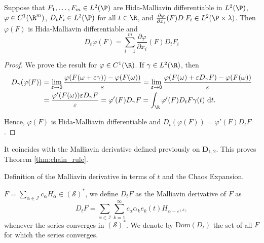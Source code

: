   \begin{theorem}\label{thm:hida-chain-rule}

    Suppose that $F_1, \ldots, F_m \in L^2(\P)$ are Hida-Malliavin differentiable in $L^2(\P)$, $\varphi \in C^1(\R^m)$, $D_tF_i \in L^2(\P)$ for all $t \in \R$, and $\frac{\partial \varphi}{\partial x_i}(F)D_{\cdot}F_i \in L^2(\P \times \lambda)$. Then $\varphi(F)$ is Hida-Malliavin differentiable and 
  \[
  D_t \varphi(F) = \sum_{i=1}^m \frac{\partial \varphi}{\partial x_i}(F) D_t F_i
  \]
  \end{theorem}

  \begin{proof}
  We prove the result for $\varphi \in C^1(\R)$. If $\gamma \in L^2(\R)$, then 
  \begin{equation*}
  \begin{aligned}
    D_\gamma(\varphi(F)) & = \lim_{\varepsilon \rightarrow 0} \frac{\varphi(F(\omega+\varepsilon \gamma))-\varphi(F(\omega))}{\varepsilon}
                         =\lim _{\varepsilon \rightarrow 0} \frac{\varphi (F(\omega)+\varepsilon D_\gamma F)-\varphi(F(\omega))}{\varepsilon} \\
                         & =\frac{\varphi^{\prime}(F(\omega)) \varepsilon D_\gamma F}{\varepsilon} = \varphi^{\prime}(F) D_\gamma F
                         =\int_{\R} \varphi^{\prime}(F) D_t F \gamma(t) ~\mathrm{d} t .
  \end{aligned}
    \label{eq:202404241654}
  \end{equation*} 

  Hence, $\varphi(F)$ is Hida-Malliavin differentiable and $D_t(\varphi(F)) = \varphi'(F) D_t F$.
  \end{proof}

  It coincides with the Malliavin derivative defined previously on $\mathbf{D}_{1,2}$. This proves Theorem \ref{thm:chain_rule}.

  Definition of the Malliavin derivative in terms of $t$ and the Chaos Expansion. 

  \begin{definition}
    $F = \sum_{\alpha \in \mathcal{I}} c_\alpha H_\alpha \in (\mathcal{S})^\ast$, we define $D_t F$ as the Malliavin derivative of $F$ as
    \[
      D_t F = \sum_{\alpha \in \mathcal{I}} \sum_{k=1}^\infty c_\alpha \alpha_k e_k(t) H_{\alpha-\varepsilon^{(k)}}
    \]
    whenever the series converges in $(\mathcal{S})^\ast$. We denote by $\text{Dom}(D_t)$ the set of all $F$ for which the series converges. 
  \end{definition}

